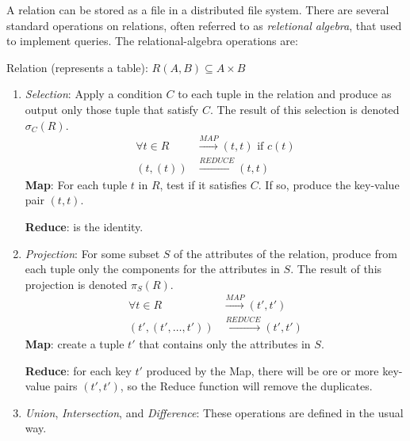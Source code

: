 A relation can be stored as a file in a distributed file system. There are several standard operations on relations, often referred to as \textit{reletional algebra}, that used to implement queries. The relational-algebra operations are:

Relation (represents a table): $R(A,B) \subseteq A \times B$

\begin{enumerate}
    \setlength\itemsep{1em}

    \item \textit{Selection}: Apply a condition $C$ to each tuple in the relation and produce as output only those tuple that satisfy $C$. The result of this selection is denoted $\sigma_C(R)$.
    \begin{equation*}
        \begin{split}
        \forall t\in R  & \xrightarrow{MAP} (t,t) \text{ if } c(t) \\
               (t, (t)) & \xrightarrow{REDUCE} (t,t) 
        \end{split}
    \end{equation*}
    \textbf{Map}: For each tuple $t$ in $R$, test if it satisfies $C$. If so, produce the key-value pair $(t, t)$.

    \textbf{Reduce}: is the identity.

    \item \textit{Projection}: For some subset $S$ of the attributes of the relation, produce from each tuple only the components for the attributes in $S$. The result of this projection is denoted $\pi_S(R)$. 
    \begin{equation*}
        \begin{split}
                  \forall t\in R & \xrightarrow{MAP} (t',t') \\
            (t', (t',\dots, t')) &\xrightarrow{REDUCE} (t',t')
        \end{split}
    \end{equation*}
    \textbf{Map}: create a tuple $t'$ that contains only the attributes in $S$.

    \textbf{Reduce}: for each key $t'$ produced by the Map, there will be ore or more key-value pairs $(t', t')$, so the Reduce function will remove the duplicates.
    
    \item \textit{Union}, \textit{Intersection}, and \textit{Difference}: These operations are defined in the usual way.  
    

\end{enumerate}
